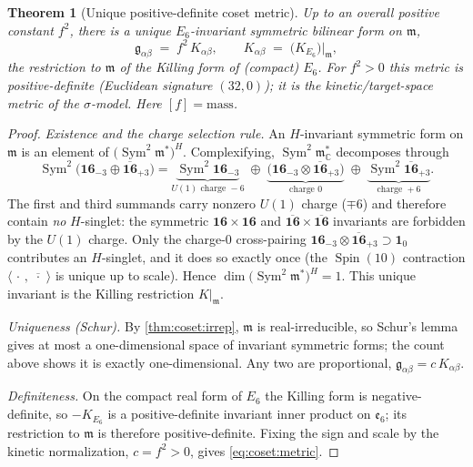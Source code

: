 \documentclass[11pt]{article}
\theoremstyle{plain}
\newtheorem{theorem}{Theorem}[section]
\theoremstyle{definition}
\theoremstyle{remark}
\newcommand{\Spin}{\operatorname{Spin}}
\newcommand{\Sym}{\operatorname{Sym}}
\begin{document}
\begin{theorem}[Unique positive-definite coset metric]\label{thm:coset:metric}
\label{thm:InvariantMetric}
\label{thm:uniqueMetric}
Up to an overall positive constant $f^{2}$, there is a unique $E_{6}$-invariant
symmetric bilinear form on $\mathfrak m$,
\begin{equation}\label{eq:coset:metric}
  \mathfrak g_{\alpha\beta} \;=\; f^{2}\,K_{\alpha\beta},
  \qquad
  K_{\alpha\beta} \;=\; \bigl(K_{E_{6}}\bigr)\big|_{\mathfrak m},
\end{equation}
the restriction to $\mathfrak m$ of the Killing form of (compact) $E_{6}$. For
$f^{2}>0$ this metric is positive-definite (Euclidean signature
$(32,0)$); it is the kinetic/target-space metric of the $\sigma$-model. Here
$[f] = \text{mass}$.
\end{theorem}

\begin{proof}
\emph{Existence and the charge selection rule.} An $H$-invariant symmetric form
on $\mathfrak m$ is an element of $\bigl(\Sym^{2}\mathfrak m^{*}\bigr)^{H}$.
Complexifying, $\Sym^{2}\mathfrak m_{\mathbb C}^{*}$ decomposes through
\begin{equation}\label{eq:coset:sym2}
  \Sym^{2}\!\bigl(\mathbf{16}_{-3}\oplus\overline{\mathbf{16}}_{+3}\bigr)
  = \underbrace{\Sym^{2}\mathbf{16}_{-3}}_{U(1)\text{ charge }-6}
    \;\oplus\;
    \underbrace{\bigl(\mathbf{16}_{-3}\otimes\overline{\mathbf{16}}_{+3}\bigr)}_{\text{charge }0}
    \;\oplus\;
    \underbrace{\Sym^{2}\overline{\mathbf{16}}_{+3}}_{\text{charge }+6}.
\end{equation}
The first and third summands carry nonzero $U(1)$ charge ($\mp 6$) and therefore
contain \emph{no} $H$-singlet: the symmetric $\mathbf{16}\times\mathbf{16}$ and
$\overline{\mathbf{16}}\times\overline{\mathbf{16}}$ invariants are forbidden by
the $U(1)$ charge. Only the charge-$0$ cross-pairing $\mathbf{16}_{-3}\otimes
\overline{\mathbf{16}}_{+3}\supset\mathbf 1_{0}$ contributes an $H$-singlet, and
it does so exactly once (the $\Spin(10)$ contraction
$\langle\,\cdot\,,\,\overline{\,\cdot\,}\,\rangle$ is unique up to scale). Hence
$\dim\bigl(\Sym^{2}\mathfrak m^{*}\bigr)^{H} = 1$. This unique invariant is the
Killing restriction $K|_{\mathfrak m}$.

\emph{Uniqueness (Schur).} By \autoref{thm:coset:irrep}, $\mathfrak m$ is
real-irreducible, so Schur's lemma gives at most a one-dimensional space of
invariant symmetric forms; the count above shows it is exactly one-dimensional.
Any two are proportional, $\mathfrak g_{\alpha\beta} = c\,K_{\alpha\beta}$.

\emph{Definiteness.} On the compact real form of $E_{6}$ the Killing form is
negative-definite, so $-K_{E_{6}}$ is a positive-definite invariant inner
product on $\mathfrak e_{6}$; its restriction to $\mathfrak m$ is therefore
positive-definite. Fixing the sign and scale by the kinetic normalization,
$c = f^{2}>0$, gives \eqref{eq:coset:metric}.
\end{proof}
\end{document}
